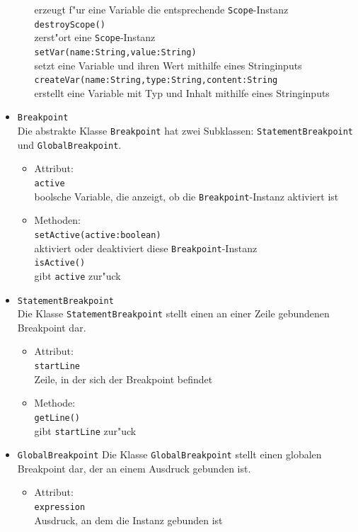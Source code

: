 \documentclass[10pt,a4paper,titlepage]{article}
\begin{document}
\begin{itemize}
\begin{itemize}
erzeugt f"ur eine Variable die entsprechende \texttt{Scope}-Instanz \\
\texttt{destroyScope()} \\
zerst"ort eine \texttt{Scope}-Instanz \\
\texttt{setVar(name:String,value:String)}  \\
setzt eine Variable und ihren Wert mithilfe eines Stringinputs \\
\texttt{createVar(name:String,type:String,content:String} \\
erstellt eine Variable mit Typ und Inhalt mithilfe eines Stringinputs 
\end{itemize}
\item \texttt{Breakpoint} \\
Die abstrakte Klasse \texttt{Breakpoint} hat zwei Subklassen: \texttt{StatementBreakpoint} und \texttt{GlobalBreakpoint}. 
\begin{itemize}
\item Attribut: \\
\texttt{active} \\
boolsche Variable, die anzeigt, ob die \texttt{Breakpoint}-Instanz aktiviert ist 
\item Methoden: \\
\texttt{setActive(active:boolean)} \\
aktiviert oder deaktiviert diese \texttt{Breakpoint}-Instanz \\
\texttt{isActive()} \\
gibt \texttt{active} zur"uck
\end{itemize}
\item \texttt{StatementBreakpoint} \\
Die Klasse \texttt{StatementBreakpoint} stellt einen an einer Zeile gebundenen Breakpoint dar. 
\begin{itemize}
\item Attribut: \\
\texttt{startLine} \\
Zeile, in der sich der Breakpoint befindet
\item Methode: \\
\texttt{getLine()} \\
gibt \texttt{startLine} zur"uck
\end{itemize}
\item \texttt{GlobalBreakpoint}
Die Klasse \texttt{GlobalBreakpoint} stellt einen globalen Breakpoint dar, der an einem Ausdruck gebunden ist. 
\begin{itemize}
\item Attribut: \\
\texttt{expression} \\
Ausdruck, an dem die Instanz gebunden ist \\
\end{itemize}
\end{itemize}
\end{document}
